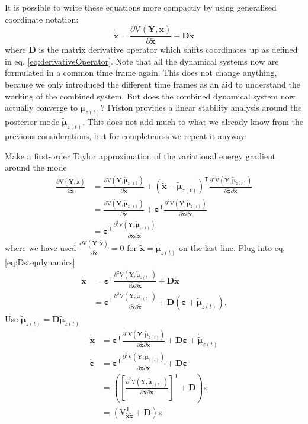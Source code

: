 \documentclass[a4paper,10pt]{article}
\newcommand{\bs}[1]{\mathbf{#1}}					%
\newcommand{\bgs}[1]{\boldsymbol{#1}}				%
\newcommand{\pd}[2]{\frac{\partial #1}{\partial #2}} 	%
\newcommand{\ppd}[3]{\frac{\partial^2 #1}{\partial #2 \partial #3}} %
\newcommand{\tr}{\mathsf{T}}				%
\newcommand{\eq}[1]{\begin{equation} #1 \end{equation}}%
\newcommand{\gc}[1]{\tilde{#1}} %
\renewcommand{\ss}{z}         %
\newcommand{\sh}{x}         %
\newcommand{\spm}{\mu}    %
\newcommand{\ph}{\bs{\sh}}    %
\newcommand{\ppm}{\bgs{\spm}}   %
\newcommand{\phg}{\gc{\ph}}    %
\newcommand{\ppmg}{\gc{\ppm}} %
\newcommand{\Po}{\bs{Y}}    %
\newcommand{\D}{\bs{D}}				%
\newcommand{\V}{\mathrm{V}}			%
\begin{document}
It is possible to write these equations more compactly by using generalised coordinate notation:
\eq{\label{eq:Dstepdynamics}
    \dot{\phg} = \pd{\V(\Po,\phg)}{\phg} + \D\phg
}
where $\D$ is the matrix derivative operator which shifts coordinates up as defined in eq. \eqref{eq:derivativeOperator}. Note that all the dynamical systems now are formulated in a common time frame again. This does not change anything, because we only introduced the different time frames as an aid to understand the working of the combined system. But does the combined dynamical system now actually converge to $\ppmg_{\ss(t)}$? Friston provides a linear stability analysis around the posterior mode $\ppmg_{\ss(t)}$. This does not add much to what we already know from the previous considerations, but for completeness we repeat it anyway:

Make a first-order Taylor approximation of the variational energy gradient around the mode
\eq{\begin{split}
    \pd{\V(\Po,\phg)}{\phg} &= \pd{\V(\Po,\ppmg_{\ss(t)})}{\phg} + (\phg - \ppmg_{\ss(t)})^\tr \ppd{\V(\Po,\ppmg_{\ss(t)})}{\phg}{\phg}\\
    &= \pd{\V(\Po,\ppmg_{\ss(t)})}{\phg} + \bgs{\varepsilon}^\tr \ppd{\V(\Po,\ppmg_{\ss(t)})}{\phg}{\phg}\\
    &=\bgs{\varepsilon}^\tr \ppd{\V(\Po,\ppmg_{\ss(t)})}{\phg}{\phg}
\end{split}}
where we have used $\pd{\V(\Po,\phg)}{\phg} = 0$ for $\phg = \ppmg_{\ss(t)}$ on the last line. Plug into eq. \eqref{eq:Dstepdynamics}
\eq{\begin{split}
    \dot{\phg} &= \bgs{\varepsilon}^\tr \ppd{\V(\Po,\ppmg_{\ss(t)})}{\phg}{\phg} + \D\phg\\
   &= \bgs{\varepsilon}^\tr \ppd{\V(\Po,\ppmg_{\ss(t)})}{\phg}{\phg} + \D (\bgs{\varepsilon} + \ppmg_{\ss(t)}).
\end{split}}
Use $\dot{\ppmg}_{\ss(t)} = \D\ppmg_{\ss(t)}$
\begin{align}
    \dot{\phg} &= \bgs{\varepsilon}^\tr \ppd{\V(\Po,\ppmg_{\ss(t)})}{\phg}{\phg} + \D\bgs{\varepsilon} + \dot{\ppmg}_{\ss(t)}\\
    \dot{\bgs{\varepsilon}} &= \bgs{\varepsilon}^\tr \ppd{\V(\Po,\ppmg_{\ss(t)})}{\phg}{\phg} + \D\bgs{\varepsilon}\\
    &= \left(\left[\ppd{\V(\Po,\ppmg_{\ss(t)})}{\phg}{\phg}\right]^\tr + \D\right) \bgs{\varepsilon}\\
    &= \left(\V_{\phg\phg}^\tr + \D\right) \bgs{\varepsilon}
\end{align}
\end{document}
